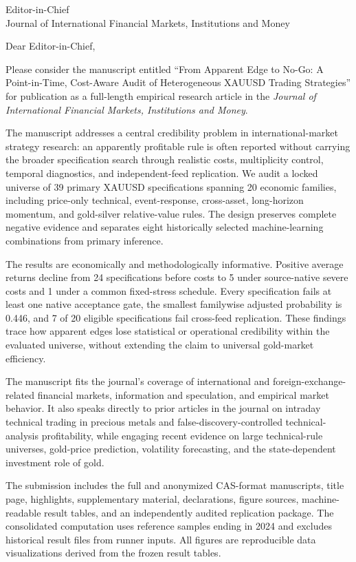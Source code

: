 \documentclass[10pt,a4paper]{letter}
\begin{document}
\begin{letter}{Editor-in-Chief\\Journal of International Financial Markets, Institutions and Money}
\opening{Dear Editor-in-Chief,}

Please consider the manuscript entitled ``From Apparent Edge to No-Go: A Point-in-Time, Cost-Aware Audit of Heterogeneous XAUUSD Trading Strategies'' for publication as a full-length empirical research article in the \emph{Journal of International Financial Markets, Institutions and Money}.

The manuscript addresses a central credibility problem in international-market strategy research: an apparently profitable rule is often reported without carrying the broader specification search through realistic costs, multiplicity control, temporal diagnostics, and independent-feed replication. We audit a locked universe of 39 primary XAUUSD specifications spanning 20 economic families, including price-only technical, event-response, cross-asset, long-horizon momentum, and gold-silver relative-value rules. The design preserves complete negative evidence and separates eight historically selected machine-learning combinations from primary inference.

The results are economically and methodologically informative. Positive average returns decline from 24 specifications before costs to 5 under source-native severe costs and 1 under a common fixed-stress schedule. Every specification fails at least one native acceptance gate, the smallest familywise adjusted probability is 0.446, and 7 of 20 eligible specifications fail cross-feed replication. These findings trace how apparent edges lose statistical or operational credibility within the evaluated universe, without extending the claim to universal gold-market efficiency.

The manuscript fits the journal's coverage of international and foreign-exchange-related financial markets, information and speculation, and empirical market behavior. It also speaks directly to prior articles in the journal on intraday technical trading in precious metals and false-discovery-controlled technical-analysis profitability, while engaging recent evidence on large technical-rule universes, gold-price prediction, volatility forecasting, and the state-dependent investment role of gold.

The submission includes the full and anonymized CAS-format manuscripts, title page, highlights, supplementary material, declarations, figure sources, machine-readable result tables, and an independently audited replication package. The consolidated computation uses reference samples ending in 2024 and excludes historical result files from runner inputs. All figures are reproducible data visualizations derived from the frozen result tables.


\end{letter}
\end{document}

